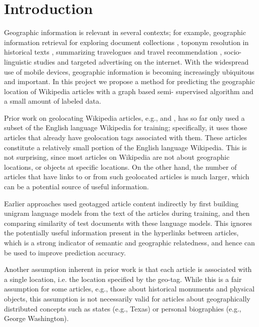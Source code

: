 \section{Introduction}

Geographic information is relevant in several contexts; for example,
geographic information retrieval for exploring document collections
\cite{ding2000computing}, toponym resolution in historical texts
\cite{smith2001disambiguating}, summarizing travelogues and travel
recommendation \cite{hao-et-al:10}, socio-linguistic studies \cite{eisenstein-
smith-xing:11} and targeted advertising on the internet.  With the widespread
use of mobile devices, geographic information is becoming increasingly
ubiquitous and important.  In this project we propose a method for predicting
the geographic location of Wikipedia articles with a graph based semi-
supervised algorithm and a small amount of labeled data.

\par Prior work on geolocating Wikipedia articles, e.g., \cite{wing-
baldridge:11} and  \cite{rolleretal:12}, has so far only used a subset of the
English language Wikipedia for training; specifically, it uses those articles
that already have geolocation tags associated with them.  These articles
constitute a relatively small portion of the English language Wikipedia.
  This is not surprising, since most articles on
Wikipedia are not about geographic locations, or objects at specific
locations. On the other hand, the number of articles that have links to or
from such geolocated articles is much larger, which can be a potential source
of useful information. 

\par Earlier approaches used geotagged article content indirectly by first
building unigram language models from the text of the articles during
training, and then comparing similarity of test documents with these language
models. This ignores the potentially useful information present in the
hyperlinks between articles, which is a strong indicator of semantic and
geographic relatedness, and hence can be used to improve prediction accuracy.

\par Another assumption inherent in prior work is that each article is
associated with a single location, i.e. the location specified by the geo-tag.
While this is a fair assumption for some articles, e.g., those about
historical monuments and physical objects, this assumption is not necessarily
valid for articles about geographically distributed concepts such as states
(e.g., Texas) or personal biographies (e.g., George Washington).

